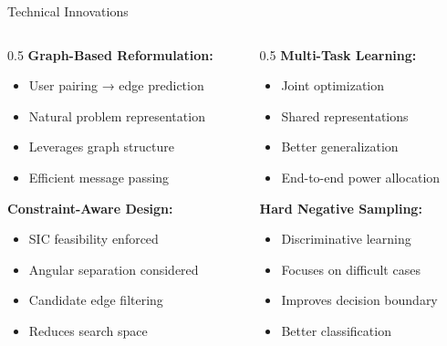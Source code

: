 \documentclass[aspectratio=169]{beamer}
\begin{document}
\begin{frame}{Technical Innovations}


    \begin{columns}
        \begin{column}{0.5\textwidth}
            \textbf{Graph-Based Reformulation:}
            \begin{itemize}
                \item User pairing → edge prediction
                \item Natural problem representation
                \item Leverages graph structure
                \item Efficient message passing
            \end{itemize}
            
      
            
            \textbf{Constraint-Aware Design:}
            \begin{itemize}
                \item SIC feasibility enforced
                \item Angular separation considered
                \item Candidate edge filtering
                \item Reduces search space
            \end{itemize}
        \end{column}
        \begin{column}{0.5\textwidth}
            \textbf{Multi-Task Learning:}
            \begin{itemize}
                \item Joint optimization
                \item Shared representations
                \item Better generalization
                \item End-to-end power allocation
            \end{itemize}
            
           
            
            \textbf{Hard Negative Sampling:}
            \begin{itemize}
                \item Discriminative learning
                \item Focuses on difficult cases
                \item Improves decision boundary
                \item Better classification
            \end{itemize}
        \end{column}
    \end{columns}
    

\end{frame}
\end{document}
